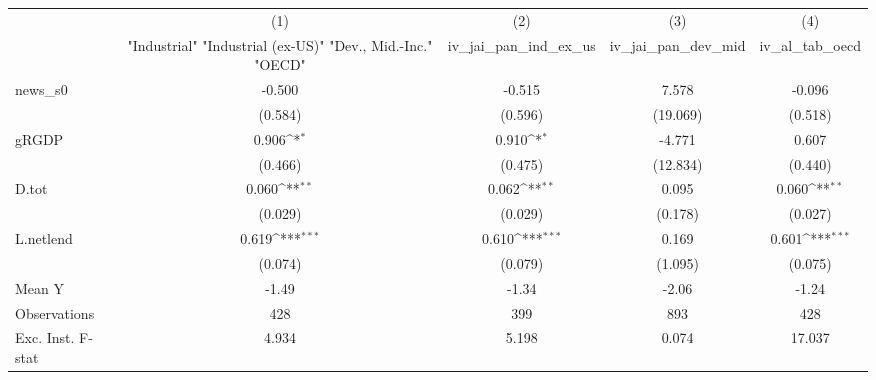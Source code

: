 {
\def\sym#1{\ifmmode^{#1}\else\(^{#1}\)\fi}
\begin{tabular}{l*{4}{c}}
\toprule
            &\multicolumn{1}{c}{(1)}&\multicolumn{1}{c}{(2)}&\multicolumn{1}{c}{(3)}&\multicolumn{1}{c}{(4)}\\
            &\multicolumn{1}{c}{ "Industrial" "Industrial (ex-US)" "Dev., Mid.-Inc." "OECD" }&\multicolumn{1}{c}{iv\_jai\_pan\_ind\_ex\_us}&\multicolumn{1}{c}{iv\_jai\_pan\_dev\_mid}&\multicolumn{1}{c}{iv\_al\_tab\_oecd}\\
\midrule
news\_s0     &      -0.500         &      -0.515         &       7.578         &      -0.096         \\
            &     (0.584)         &     (0.596)         &    (19.069)         &     (0.518)         \\
\addlinespace
gRGDP       &       0.906\sym{*}  &       0.910\sym{*}  &      -4.771         &       0.607         \\
            &     (0.466)         &     (0.475)         &    (12.834)         &     (0.440)         \\
\addlinespace
D.tot       &       0.060\sym{**} &       0.062\sym{**} &       0.095         &       0.060\sym{**} \\
            &     (0.029)         &     (0.029)         &     (0.178)         &     (0.027)         \\
\addlinespace
L.netlend   &       0.619\sym{***}&       0.610\sym{***}&       0.169         &       0.601\sym{***}\\
            &     (0.074)         &     (0.079)         &     (1.095)         &     (0.075)         \\
\midrule
Mean Y      &       -1.49         &       -1.34         &       -2.06         &       -1.24         \\
Observations&         428         &         399         &         893         &         428         \\
Exc. Inst. F-stat&       4.934         &       5.198         &       0.074         &      17.037         \\
\bottomrule
\end{tabular}
}
